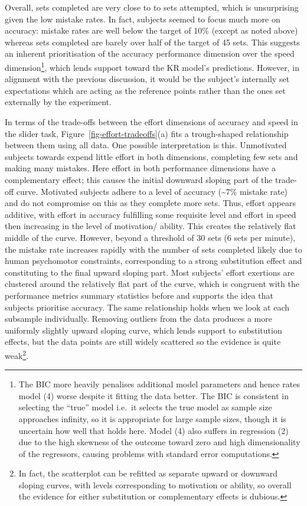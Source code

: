 \documentclass[
  12,
  letterpaper,
  DIV=11,
  numbers=noendperiod]{scrartcl}
\begin{document}
Overall, sets completed are very close to to sets attempted, which is
unsurprising given the low mistake rates. In fact, subjects seemed to
focus much more on accuracy: mistake rates are well below the target of
10\% (except as noted above) whereas sets completed are barely over half
of the target of 45 sets. This suggests an inherent prioritisation of
the accuracy performance dimension over the speed dimension\footnote{The
  BIC more heavily penalises additional model parameters and hence rates
  model (4) worse despite it fitting the data better. The BIC is
  consistent in selecting the ``true'' model i.e.~it selects the true
  model as sample size approaches infinity, so it is appropriate for
  large sample sizes, though it is uncertain how well that holds here.
  Model (4) also suffers in regression (2) due to the high skewness of
  the outcome toward zero and high dimensionality of the regressors,
  causing problems with standard error computations.}, which lends
support toward the KR model's predictions. However, in alignment with
the previous discussion, it would be the subject's internally set
expectations which are acting as the reference points rather than the
ones set externally by the experiment.

In terms of the trade-offs between the effort dimensions of accuracy and
speed in the slider task, Figure~\ref{fig-effort-tradeoffs}(a) fits a
trough-shaped relationship between them using all data. One possible
interpretation is this. Unmotivated subjects towards expend little
effort in both dimensions, completing few sets and making many mistakes.
Here effort in both performance dimensions have a complementary effect;
this causes the initial downward sloping part of the trade-off curve.
Motivated subjects adhere to a level of accuracy (\textasciitilde7\%
mistake rate) and do not compromise on this as they complete more sets.
Thus, effort appears additive, with effort in accuracy fulfilling some
requisite level and effort in speed then increasing in the level of
motivation/ ability. This creates the relatively flat middle of the
curve. However, beyond a threshold of 30 sets (6 sets per minute), the
mistake rate increases rapidly with the number of sets completed likely
due to human psychomotor constraints, corresponding to a strong
substitution effect and constituting to the final upward sloping part.
Most subjects' effort exertions are clustered around the relatively flat
part of the curve, which is congruent with the performance metrics
summary statistics before and supports the idea that subjects prioritise
accuracy. The same relationship holds when we look at each subsample
individually. Removing outliers from the data produces a more uniformly
slightly upward sloping curve, which lends support to substitution
effects, but the data points are still widely scattered so the evidence
is quite weak\footnote{In fact, the scatterplot can be refitted as
  separate upward or downward sloping curves, with levels corresponding
  to motivation or ability, so overall the evidence for either
  substitution or complementary effects is dubious.}.
\end{document}
